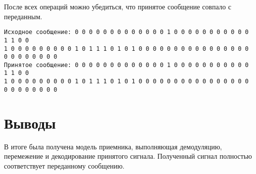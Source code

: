 После всех операций можно убедиться, что принятое сообщение совпало с переданным.
\begin{verbatim}
Исходное сообщение: 0 0 0 0 0 0 0 0 0 0 0 0 0 1 0 0 0 0 0 0 0 0 0 0 0 1 1 0 0 
1 0 0 0 0 0 0 0 0 0 1 0 1 1 1 0 1 0 1 0 0 0 0 0 0 0 0 0 0 0 0 0 0 0 0 0 0 0 0 0 0 0 0
Принятое сообщение: 0 0 0 0 0 0 0 0 0 0 0 0 0 1 0 0 0 0 0 0 0 0 0 0 0 1 1 0 0
1 0 0 0 0 0 0 0 0 0 1 0 1 1 1 0 1 0 1 0 0 0 0 0 0 0 0 0 0 0 0 0 0 0 0 0 0 0 0 0 0 0 0
\end{verbatim}

\newpage
\section{Выводы}
В итоге была получена модель приемника, выполняющая демодуляцию, перемежение и декодирование принятого сигнала. Полученный сигнал полностью соответствует переданному сообщению.


